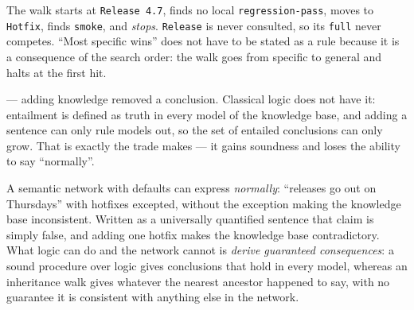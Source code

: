 \begin{ans}
  \item The walk starts at \texttt{Release 4.7}, finds no local
        \texttt{regression-pass}, moves to \texttt{Hotfix}, finds \texttt{smoke},
        and \emph{stops}. \texttt{Release} is never consulted, so its \texttt{full}
        never competes. ``Most specific wins'' does not have to be stated as a rule
        because it is a consequence of the search order: the walk goes from
        specific to general and halts at the first hit.
  \item {} --- adding knowledge removed a conclusion.
        Classical logic does not have it: entailment is defined as truth in every
        model of the knowledge base, and adding a sentence can only rule models
        out, so the set of entailed conclusions can only grow. That is exactly the
        trade  makes --- it gains soundness and loses the
        ability to say ``normally''.
  \item A semantic network with defaults can express \emph{normally}: ``releases go
        out on Thursdays'' with hotfixes excepted, without the exception making the
        knowledge base inconsistent. Written as a universally quantified sentence
        that claim is simply false, and adding one hotfix makes the knowledge base
        contradictory. What logic can do and the network cannot is \emph{derive
        guaranteed consequences}: a sound procedure over logic gives conclusions
        that hold in every model, whereas an inheritance walk gives whatever the
        nearest ancestor happened to say, with no guarantee it is consistent with
        anything else in the network.
\end{ans}

